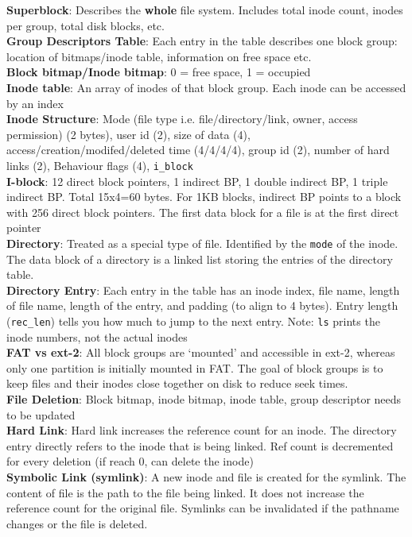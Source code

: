 \documentclass{article}
\begin{document}
{\begin{multicols*}{3}
\textbf{Superblock}: Describes the \textbf{whole} file system. Includes total inode count, inodes per group, total disk blocks, etc. \\
\textbf{Group Descriptors Table}: Each entry in the table describes one block group: location of bitmaps/inode table, information on free space etc. \\
\textbf{Block bitmap/Inode bitmap}: 0 = free space, 1 = occupied\\
\textbf{Inode table}: An array of inodes of that block group. Each inode can be accessed by an index \\
\textbf{Inode Structure}: Mode (file type i.e. file/directory/link, owner, access permission) (2 bytes), user id (2), size of data (4), access/creation/modifed/deleted time (4/4/4/4), group id (2), number of hard links (2), Behaviour flags (4), \texttt{i\_block} \\
\textbf{I-block}: 12 direct block pointers, 1 indirect BP, 1 double indirect BP, 1 triple indirect BP. Total 15x4=60 bytes. For 1KB blocks, indirect BP points to a block with 256 direct block pointers. The first data block for a file is at the first direct pointer  \\
\textbf{Directory}: Treated as a special type of file. Identified by the \texttt{mode} of the inode. The data block of a directory is a linked list storing the entries of the directory table. \\
\textbf{Directory Entry}: Each entry in the table has an inode index, file name, length of file name, length of the entry, and padding (to align to 4 bytes). Entry length (\texttt{rec\_len}) tells you how much to jump to the next entry. Note: \texttt{ls} prints the inode numbers, not the actual inodes  \\
\textbf{FAT vs ext-2}: All block groups are `mounted' and accessible in ext-2, whereas only one partition is initially mounted in FAT. The goal of block groups is to keep files and their inodes close together on disk to reduce seek times. \\ 
\textbf{File Deletion}: Block bitmap, inode bitmap, inode table, group descriptor needs to be updated \\
\textbf{Hard Link}: Hard link increases the reference count for an inode. The directory entry directly refers to the inode that is being linked. Ref count is decremented for every deletion (if reach 0, can delete the inode) \\
\textbf{Symbolic Link (symlink)}: A new inode and file is created for the symlink. The content of file is the path to the file being linked. It does not increase the reference count for the original file. Symlinks can be invalidated if the pathname changes or the file is deleted.
\end{multicols*}

}
\end{document}
